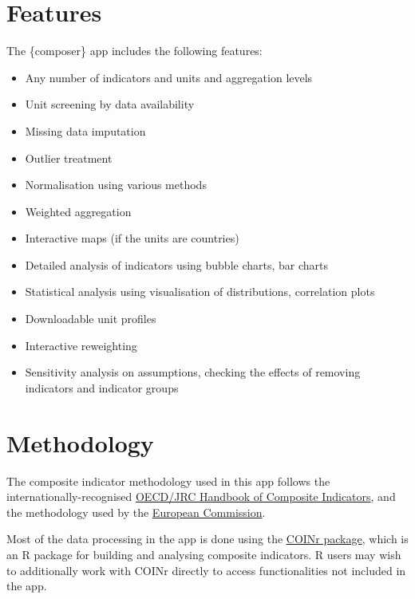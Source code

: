 \documentclass[
  letterpaper,
  DIV=11,
  numbers=noendperiod]{scrreprt}
\providecommand{\tightlist}{%
  \setlength{\itemsep}{0pt}\setlength{\parskip}{0pt}}\usepackage{longtable,booktabs,array}
\begin{document}
\hypertarget{features}{%
\section{Features}\label{features}}

The \{composer\} app includes the following features:

\begin{itemize}
\tightlist
\item
  Any number of indicators and units and aggregation levels
\item
  Unit screening by data availability
\item
  Missing data imputation
\item
  Outlier treatment
\item
  Normalisation using various methods
\item
  Weighted aggregation
\item
  Interactive maps (if the units are countries)
\item
  Detailed analysis of indicators using bubble charts, bar charts
\item
  Statistical analysis using visualisation of distributions, correlation
  plots
\item
  Downloadable unit profiles
\item
  Interactive reweighting
\item
  Sensitivity analysis on assumptions, checking the effects of removing
  indicators and indicator groups
\end{itemize}

\hypertarget{methodology}{%
\section{Methodology}\label{methodology}}

The composite indicator methodology used in this app follows the
internationally-recognised
\href{https://publications.jrc.ec.europa.eu/repository/handle/JRC47008}{OECD/JRC
Handbook of Composite Indicators}, and the methodology used by the
\href{https://knowledge4policy.ec.europa.eu/composite-indicators_en}{European
Commission}.

Most of the data processing in the app is done using the
\href{https://bluefoxr.github.io/COINr/}{COINr package}, which is an R
package for building and analysing composite indicators. R users may
wish to additionally work with COINr directly to access functionalities
not included in the app.
\end{document}
